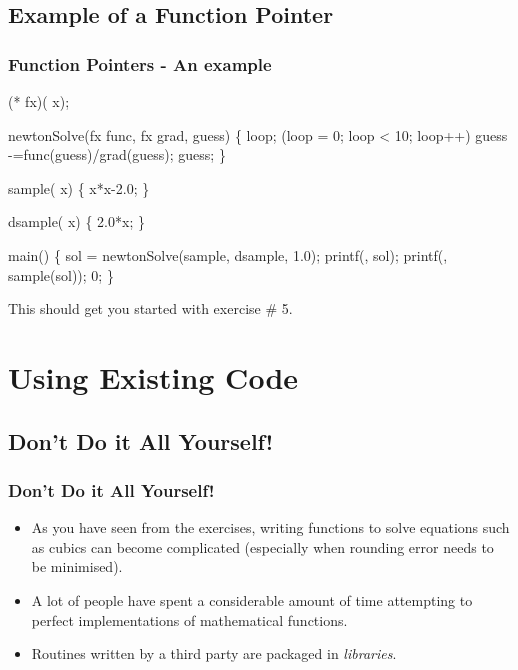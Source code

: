 \documentclass[smaller,table]{beamer} %
\begin{document}
\subsection{Example of a Function Pointer}
\begin{frame}[fragile]
\frametitle{Function Pointers - An example}
\vspace{-0.2in}
\begin{semiverbatim}
\tiny
{} 
 (* fx)( x);

 newtonSolve(fx func, fx grad,  guess)
\{
    loop;
    (loop = 0; loop < 10; loop++) guess -=func(guess)/grad(guess);
    guess;
\}

 sample( x)
\{
    x*x-2.0;
\}

 dsample( x)
\{
    2.0*x;
\}

 main()
\{
    sol = newtonSolve(sample, dsample, 1.0);
   printf(, sol);     
   printf(, sample(sol));
    0;
\}
\end{semiverbatim}
This should get you started with exercise \# 5.
\end{frame}

\section{Using Existing Code}
\subsection{Don't Do it All Yourself!}
\begin{frame}
\frametitle{Don't Do it All Yourself!}
\begin{itemize}
\item As you have seen from the exercises, writing functions to solve equations such as cubics can become complicated (especially when rounding error needs to be minimised).
\item A lot of people have spent a considerable amount of time attempting to perfect implementations of mathematical functions.
\item Routines written by a third party are packaged in \emph{libraries}.
\end{itemize}
\end{frame}
\end{document}
